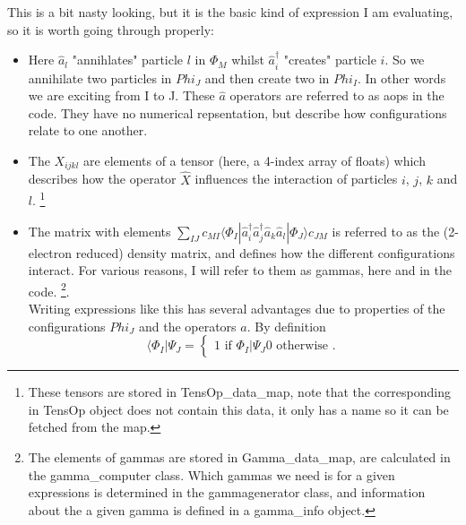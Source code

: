 \documentclass[12pt]{article}
\begin{document}
This is a bit nasty looking, but it is the basic kind of expression I am evaluating, so it is worth going through properly:
\begin{itemize}
\item Here $\hat{a}_{l}$ "annihlates" particle $l$ in $\Phi_{M}$ whilst
$\hat{a}^{\dagger}_{i}$ "creates" particle $i$. So we annihilate two particles in $Phi_{J}$
and then create two in $Phi_{I}$. In other words we are exciting from I to J.
These $\hat{a}$ operators are referred to as aops in the code. They have no numerical repsentation,
but describe how configurations relate to one another.
\item The $X_{ijkl}$ are elements of a tensor (here, a 4-index array of floats) which describes how
the operator $\hat{X}$ influences the interaction of particles $i$, $j$, $k$ and $l$.
\footnote{These tensors are stored in TensOp_data_map, note that the corresponding in TensOp object
does not contain this data, it only has a name so it can be fetched from the map. }  \\
\item The matrix with elements
$\sum_{IJ} c_{MI}\langle \Phi_{I} | \hat{a}_{i}^{\dagger}\hat{a}_{j}^{\dagger}\hat{a}_{k}\hat{a}_{l} | \Phi_{J} \rangle c_{JM}  $
is referred to as the (2-electron reduced) density matrix, and defines how the different configurations interact. For various reasons,
I will refer to them as gammas, here and in the code. \footnote{The elements of gammas are stored in Gamma_data_map, are
calculated in the gamma_computer class. Which gammas we need is for a given expressions is
determined in the gammagenerator class, and information about the a given gamma is defined in a gamma_info object.}.\\

Writing expressions like this has several advantages due to properties of the configurations
 $Phi_{J}$ and the operators $\hat{a}$. By definition
\begin{equation}
\langle \Phi_{I} | \Psi_{J} = 
\begin{cases}
1 \text{\  \ \ \  \ \ \ \ if } \Phi_{I} | \Psi_{J} 
0 \text{ \ \ otherwise }.
\end{cases}
\label{eqn:overlap}
\end{equation}


\end{itemize}
\end{document}
